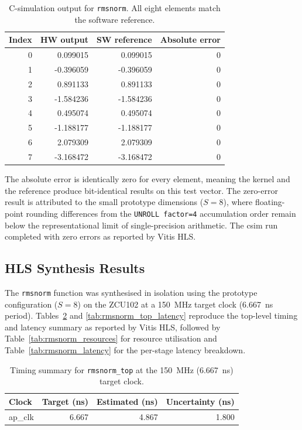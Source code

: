 \begin{table}[H]
  \centering
  \begin{tabular}{rrrr}
    \toprule
    Index & HW output & SW reference & Absolute error \\
    \midrule
    0 &  0.099015 &  0.099015 & 0 \\
    1 & -0.396059 & -0.396059 & 0 \\
    2 &  0.891133 &  0.891133 & 0 \\
    3 & -1.584236 & -1.584236 & 0 \\
    4 &  0.495074 &  0.495074 & 0 \\
    5 & -1.188177 & -1.188177 & 0 \\
    6 &  2.079309 &  2.079309 & 0 \\
    7 & -3.168472 & -3.168472 & 0 \\
    \bottomrule
  \end{tabular}
  \caption{C-simulation output for \texttt{rmsnorm}.
           All eight elements match the software reference.}
  \label{tab:rmsnorm_csim}

\end{table}

The absolute error is identically zero for every element, meaning the
kernel and the reference produce bit-identical results on this test
vector. The zero-error result is attributed to the small prototype dimensions
($S = 8$), where floating-point rounding differences from the
\texttt{UNROLL factor=4} accumulation order remain below the
representational limit of single-precision arithmetic.
The csim run completed with zero errors as reported by Vitis HLS.

\subsection{HLS Synthesis Results}
\label{subsec:rmsnorm_csyn}

The \texttt{rmsnorm} function was synthesised in isolation using the
prototype configuration ($S = 8$) on the ZCU102
at a \SI{150}{\mega\hertz} target clock (\SI{6.667}{\nano\second}
period). Tables~\ref{tab:rmsnorm_timing} and \ref{tab:rmsnorm_top_latency}
reproduce the top-level timing and latency summary as reported by Vitis
HLS, followed by Table~\ref{tab:rmsnorm_resources} for resource utilisation
and Table~\ref{tab:rmsnorm_latency} for the per-stage latency breakdown.

\begin{table}[H]
  \centering
  \begin{tabular}{lrrr}
    \toprule
    Clock   & Target (ns) & Estimated (ns) & Uncertainty (ns) \\
    \midrule
    ap\_clk & 6.667       & 4.867          & 1.800 \\
    \bottomrule
  \end{tabular}
  \caption{Timing summary for \texttt{rmsnorm\_top} at the
           \SI{150}{\mega\hertz} (\SI{6.667}{\nano\second}) target clock.}
  \label{tab:rmsnorm_timing}

\end{table}

